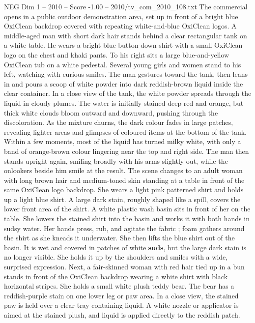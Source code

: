 \begin{textsample}{NEG Dim 1 – 2010 – Score -1.00 – 2010/tv\_com\_2010\_108.txt}  \label{ex:f1_neg_072}
The commercial opens in a public outdoor demonstration area, set up in front of a bright blue OxiClean backdrop covered with repeating white-and-blue OxiClean logos.
A middle-aged man with short dark hair stands behind a clear rectangular tank on a white table.
He wears a bright blue button-down shirt with a small OxiClean logo on the chest and khaki pants.
To his right sits a large blue-and-yellow OxiClean tub on a white pedestal.
Several young girls and women stand to his left, watching with curious smiles.
The man gestures toward the tank, then leans in and pours a scoop of white powder into dark reddish-brown liquid inside the clear container.
In a close view of the tank, the white powder spreads through the liquid in cloudy plumes.
The water is initially stained deep red and orange, but thick white clouds bloom outward and downward, pushing through the discoloration.
As the mixture churns, the dark colour fades in large patches, revealing lighter areas and glimpses of coloured items at the bottom of the tank.
Within a few moments, most of the liquid has turned milky white, with only a band of orange-brown colour lingering near the top and right side.
The man then stands upright again, smiling broadly with his arms slightly out, while the onlookers beside him smile at the result.
The scene changes to an adult woman with long brown hair and medium-toned skin standing at a table in front of the same OxiClean logo backdrop.
She wears a light pink patterned shirt and holds up a light blue shirt.
A large dark stain, roughly shaped like a spill, covers the lower front area of the shirt.
A white plastic wash basin sits in front of her on the table.
She lowers the stained shirt into the basin and works it with both hands in sudsy water.
Her hands press, rub, and agitate the fabric ; foam gathers around the shirt as she kneads it underwater.
She then lifts the blue shirt out of the basin.
It is wet and covered in patches of white \textbf{suds}, but the large dark stain is no longer visible.
She holds it up by the shoulders and smiles with a wide, surprised expression.
Next, a fair-skinned woman with red hair tied up in a bun stands in front of the OxiClean backdrop wearing a white shirt with black horizontal stripes.
She holds a small white plush teddy bear.
The bear has a reddish-purple stain on one lower leg or paw area.
In a close view, the stained paw is held over a clear tray containing liquid.
A white nozzle or applicator is aimed at the stained plush, and liquid is applied directly to the reddish patch.

\end{textsample}
